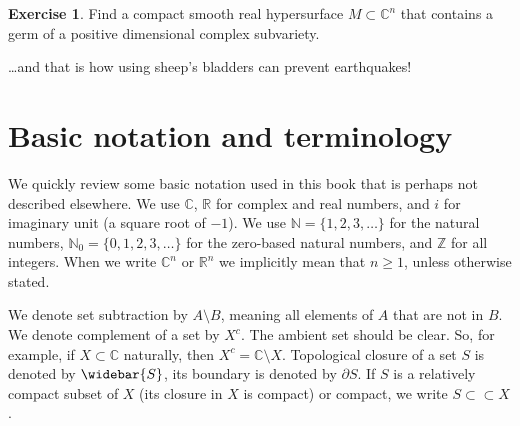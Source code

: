 \documentclass[12pt,openany]{book}
\newcommand{\C}{{\mathbb{C}}}
\newcommand{\R}{{\mathbb{R}}}
\newcommand{\Z}{{\mathbb{Z}}}
\newcommand{\N}{{\mathbb{N}}}
\theoremstyle{plain}
\theoremstyle{remark}
\theoremstyle{definition}
\newenvironment{exbox}{%
    \def\FrameCommand{\vrule width 1pt \relax\hspace{10pt}}%
    \MakeFramed{\advance\hsize-\width\FrameRestore}%
}{%
    \endMakeFramed
}
\theoremstyle{exercise}
\newtheorem{exercise}{Exercise}[section]
\theoremstyle{example}
\begin{document}
\begin{exbox}
\begin{exercise}
Find a compact smooth real hypersurface $M \subset \C^n$ that contains a germ
of a positive dimensional complex subvariety.
\end{exercise}
\end{exbox}

\vspace{1in}

\ldots and that is how using sheep's bladders can prevent
earthquakes!


\appendix



\chapter{Basic notation and terminology} \label{ap:basicnotation}



We quickly review some basic notation used in this
book that is perhaps not described elsewhere.
We use $\C$, $\R$ for complex and real numbers, and $i$ for imaginary unit
(a square root of $-1$).  We use
$\N = \{ 1,2,3, \ldots \}$ for 
the natural numbers, 
$\N_0 = \{ 0,1,2,3, \ldots \}$ for the zero-based natural numbers,
and $\Z$ for all integers.
When we write $\C^n$ or $\R^n$ we implicitly mean that $n \geq 1$, unless
otherwise stated.

%
We denote set subtraction by $A \setminus B$, meaning all elements of
$A$ that are not in $B$.
We denote complement of a set by $X^c$.  The ambient set
should be clear.  So, for example, if $X \subset \C$ naturally,
then $X^c = \C \setminus X$.
%
Topological closure of a set $S$ is denoted by $\widebar{S}$, its
boundary is denoted by
%
$\partial S$.  If $S$ is a relatively compact subset of $X$
(its closure in $X$ is compact) or compact, we write $S \subset \subset X$.
\end{document}
